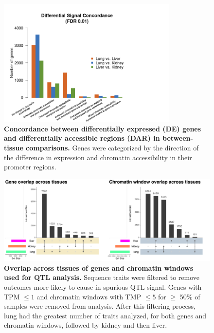 \documentclass[9pt,twocolumn,twoside]{gsajnl}
\begin{document}
\begin{figure}[hp]
\renewcommand{\familydefault}{\sfdefault}\normalfont
\centering
\includegraphics[width=0.8\textwidth, trim={0in 0in 0in 0in}, clip]{figs/diff_concordance.png}
\caption{\textbf{Concordance between differentially expressed (DE) genes and differentially accessible regions (DAR) in between-tissue comparisons.} Genes were categorized by the direction of the difference in expression and chromatin accessibility in their promoter regions.\label{fig:diff_concordance}}
\end{figure}

\begin{figure}[hp]
\renewcommand{\familydefault}{\sfdefault}\normalfont
\centering
\includegraphics[width=\textwidth, trim={0in 0in 0in 0in}, clip]{figs/upset_genes_chromatin.pdf}
\caption{\textbf{Overlap across tissues of genes and chromatin windows used for QTL analysis.} Sequence traits were filtered to remove outcomes more likely to cause in spurious QTL signal. Genes with TPM $\le 1$ and chromatin windows with TMP $\le 5$ for $\ge$ 50\% of samples were removed from analysis. After this filtering process, lung had the greatest number of traits analyzed, for both genes and chromatin windows, followed by kidney and then liver. 
\label{fig:upset_genes_chromatin}}
\end{figure}
\end{document}
